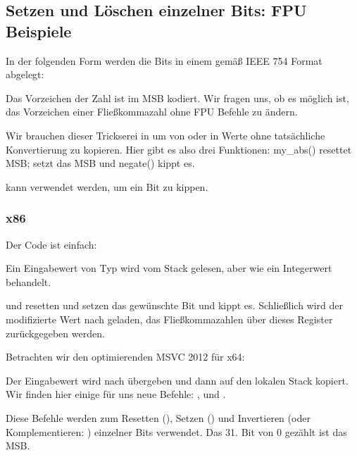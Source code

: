 \subsection{Setzen und Löschen einzelner Bits: \ac{FPU} Beispiele}

In der folgenden Form werden die Bits in einem \Tfloat gemäß IEEE 754 Format
abgelegt:


Das Vorzeichen der Zahl ist im \ac{MSB} kodiert.
Wir fragen uns, ob es möglich ist, das Vorzeichen einer Fließkommazahl ohne FPU
Befehle zu ändern.


Wir brauchen dieser Trickserei in \CCpp um von oder in \Tfloat Werte ohne
tatsächliche Konvertierung zu kopieren.
Hier gibt es also drei Funktionen: my\_abs() resettet \ac{MSB}; 
setzt das \ac{MSB} und negate() kippt es.

\XOR kann verwendet werden, um ein Bit zu kippen.

\subsubsection{x86}

Der Code ist einfach:


Ein Eingabewert von Typ \Tfloat wird vom Stack gelesen, aber wie ein Integerwert
behandelt.

\AND und \OR resetten und setzen das gewünschte Bit und \XOR kippt es.
Schließlich wird der modifizierte Wert nach  geladen, das
Fließkommazahlen über dieses Register zurückgegeben werden.

Betrachten wir den optimierenden MSVC 2012 für x64:



Der Eingabewert wird nach  übergeben und dann auf den lokalen Stack
kopiert. Wir finden hier einige für uns neue Befehle: \BTR, \BTS und \BTC.

Diese Befehle werden zum Resetten (\BTR), Setzen (\BTS) und Invertieren (oder
Komplementieren: \BTC) einzelner Bits verwendet.
Das 31. Bit von 0 gezählt ist das \ac{MSB}.

